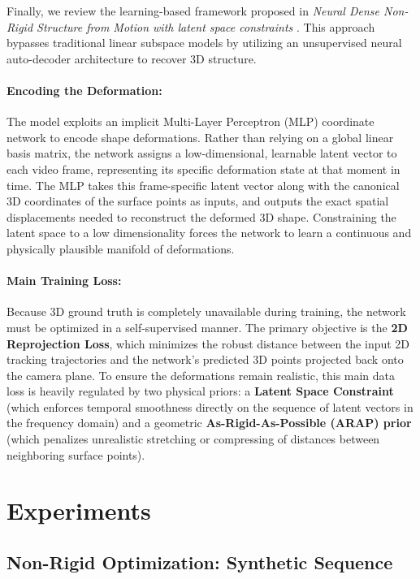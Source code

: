 \documentclass{article}
\begin{document}
Finally, we review the learning-based framework proposed in \textit{Neural Dense Non-Rigid Structure from Motion with latent space constraints} \cite{sidhu2020neural}. This approach bypasses traditional linear subspace models by utilizing an unsupervised neural auto-decoder architecture to recover 3D structure.

\paragraph{Encoding the Deformation:} The model exploits an implicit Multi-Layer Perceptron (MLP) coordinate network to encode shape deformations. Rather than relying on a global linear basis matrix, the network assigns a low-dimensional, learnable latent vector to each video frame, representing its specific deformation state at that moment in time. The MLP takes this frame-specific latent vector along with the canonical 3D coordinates of the surface points as inputs, and outputs the exact spatial displacements needed to reconstruct the deformed 3D shape. Constraining the latent space to a low dimensionality forces the network to learn a continuous and physically plausible manifold of deformations.

\paragraph{Main Training Loss:} Because 3D ground truth is completely unavailable during training, the network must be optimized in a self-supervised manner. The primary objective is the \textbf{2D Reprojection Loss}, which minimizes the robust distance between the input 2D tracking trajectories and the network's predicted 3D points projected back onto the camera plane. To ensure the deformations remain realistic, this main data loss is heavily regulated by two physical priors: a \textbf{Latent Space Constraint} (which enforces temporal smoothness directly on the sequence of latent vectors in the frequency domain) and a geometric \textbf{As-Rigid-As-Possible (ARAP) prior} (which penalizes unrealistic stretching or compressing of distances between neighboring surface points).


\section{Experiments}
\label{sec:Experiments}

\subsection{Non-Rigid Optimization: Synthetic Sequence}
\end{document}
